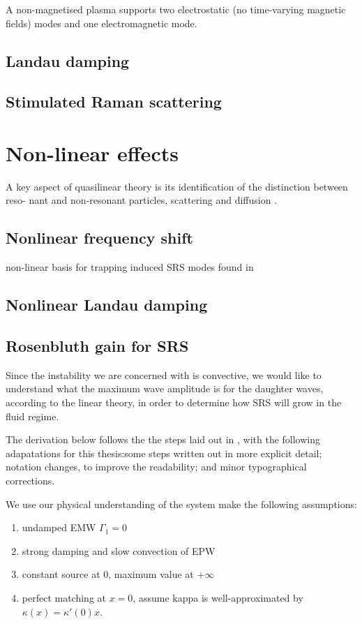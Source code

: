 A non-magnetised plasma supports two electrostatic (no time-varying magnetic fields) modes and one electromagnetic mode.

\subsection{Landau damping}

\subsection{Stimulated Raman scattering}


\section{Non-linear effects}
A key aspect of quasilinear theory is its identification of the distinction between reso-
nant and non-resonant particles, scattering and diffusion \citep{Sagdeev2018}.

\subsection{Nonlinear frequency shift}
non-linear basis for trapping induced SRS modes found in \cite{Rose2001}
\subsection{Nonlinear Landau damping}



\subsection{Rosenbluth gain for SRS}

Since the instability we are concerned with is convective, we would like to understand what the maximum wave amplitude is for the daughter waves, according to the linear theory, in order to determine how SRS will grow in the fluid regime.

The derivation below follows the the steps laid out in \citet{Nishikawa1976}, with the following adapatations for this thesis:some steps written out in more explicit detail; notation changes, to improve the readability; and minor typographical corrections. 

We use our physical understanding of the system make the following assumptions:
\begin{enumerate}
	\item undamped EMW $\Gamma_1 = 0$
	\item strong damping and slow convection of EPW
	\item constant source at 0, maximum value at $+\infty$
	\item perfect matching at $x=0$, assume kappa is well-approximated by 
	$\kappa(x) = \kappa'(0)x$.
\end{enumerate}

